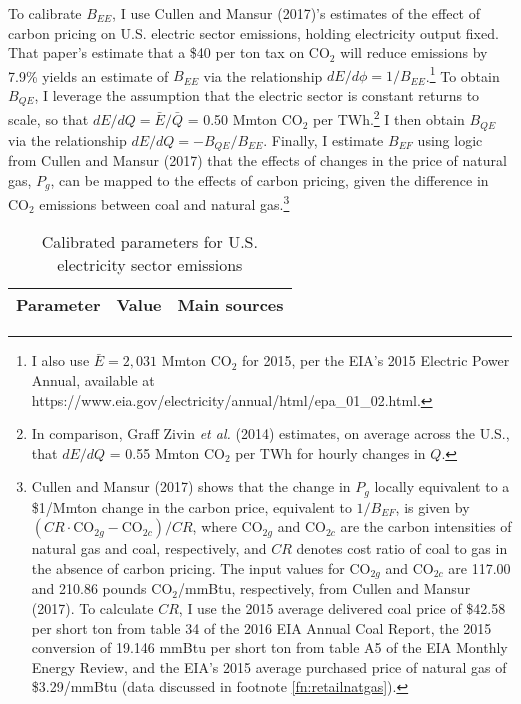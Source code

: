 \documentclass[12pt]{article}
\begin{document}
To calibrate $B_{EE}$, I use Cullen and Mansur (2017)'s estimates of the effect of carbon pricing on U.S. electric sector emissions, holding electricity output fixed. That paper's estimate that a \$40 per ton tax on CO$_2$ will reduce emissions by 7.9\% yields an estimate of $B_{EE}$ via the relationship $dE/d\phi=1/B_{EE}$.\footnote{I also use $\bar{E}=2,031$ Mmton CO$_2$ for 2015, per the EIA's 2015 Electric Power Annual, available at https://www.eia.gov/electricity/annual/html/epa\_01\_02.html.} To obtain $B_{QE}$, I leverage the assumption that the electric sector is constant returns to scale, so that $dE/dQ = \bar{E}/\bar{Q}$ = 0.50 Mmton CO$_2$ per TWh.\footnote{In comparison, Graff Zivin {\it et al.} (2014) estimates, on average across the U.S., that $dE/dQ$ = 0.55 Mmton CO$_2$ per TWh for hourly changes in $Q$.} I then obtain $B_{QE}$ via the relationship $dE/dQ = -B_{QE}/B_{EE}$. Finally, I estimate $B_{EF}$ using logic from Cullen and Mansur (2017) that the effects of changes in the price of natural gas, $P_g$, can be mapped to the effects of carbon pricing, given the difference in CO$_2$ emissions between coal and natural gas.\footnote{Cullen and Mansur (2017) shows that the change in $P_g$ locally equivalent to a \$1/Mmton change in the carbon price, equivalent to $1/B_{EF}$, is given by $(CR\cdot \text{CO}_{2g} - \text{CO}_{2c}) / CR$, where $\text{CO}_{2g}$ and $\text{CO}_{2c}$ are the carbon intensities of natural gas and coal, respectively, and $CR$ denotes cost ratio of coal to gas in the absence of carbon pricing. The input values for $\text{CO}_{2g}$ and $\text{CO}_{2c}$ are 117.00 and 210.86 pounds CO$_2$/mmBtu, respectively, from Cullen and Mansur (2017). To calculate $CR$, I use the 2015 average delivered coal price of \$42.58 per short ton from table 34 of the 2016 EIA Annual Coal Report, the 2015 conversion of  19.146 mmBtu per short ton from table A5 of the EIA Monthly Energy Review, and the EIA's 2015 average purchased price of natural gas of \$3.29/mmBtu (data discussed in footnote \ref{fn:retailnatgas}).}

\begin{table}[!t]
\begin{center}
\caption{Calibrated parameters for U.S. electricity sector emissions}
\begin{footnotesize}
\begin{tabular}{lll}
Parameter & Value & Main sources \\
\hline

\hline
\end{tabular}
\end{footnotesize}
\label{tab:calelec}
\end{center}
\end{table}
\end{document}

